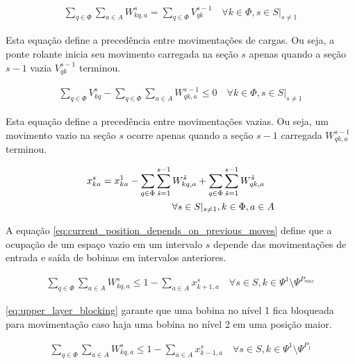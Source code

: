 \documentclass[journal]{IEEEtran}
\begin{document}
        \begin{align}
            \sum_{q \in \Phi} \sum_{a \in A} W^s_{kq,a} = \sum_{q \in \Phi} V^{s-1}_{qk} \quad \forall k \in \Phi, s \in S |_{s \neq 1}
            \label{eq:movement_precence_ld_after_empty}
        \end{align}

        Esta equação define a precedência entre movimentações de cargas. Ou seja,
        a ponte rolante inicia seu movimento carregada na seção $s$ apenas quando
        a seção $s-1$ vazia $V^{s-1}_{qk}$ terminou.

        \begin{align}
            \sum_{q \in \Phi} V^s_{kq} - \sum_{q \in \Phi} \sum_{a \in A} W^{s-1}_{qk,a} \leq 0 \quad \forall k \in \Phi, s \in S |_{s \neq 1}
            \label{eq:movement_precence_empty_after_ld}
        \end{align}

        Esta equação define a precedência entre movimentações vazias. Ou seja,
        um movimento vazio na seção $s$ ocorre apenas quando
        a seção $s-1$ carregada $W^{s-1}_{qk,a}$ terminou.

        \begin{align}
            x^s_{ka} = x^1_{ka} - \sum_{q \in \Phi} \sum_{\hat{s}=1}^{s-1} W^{\hat{s}}_{kq,a} + \sum_{q \in \Phi} \sum_{\hat{s}=1}^{s-1} W^{\hat{s}}_{qk,a} \quad \notag \\
            \forall s \in S |_{s \neq 1}, k \in \Phi, a \in A
            \label{eq:current_position_depends_on_previous_moves}
        \end{align}

        A equação \ref{eq:current_position_depends_on_previous_moves} define
        que a ocupação de um espaço vazio em um intervalo $s$ depende das movimentações
        de entrada e saída de bobinas em intervalos anteriores.


        \begin{align}
            \sum_{q \in \Phi} \sum_{a \in A} W^s_{kq,a} \leq 1 - \sum_{a \in A} x^s_{k+1,a} \quad \forall s \in S, k \in \Psi^1 \setminus \Psi^{P_{max}}
            \label{eq:upper_layer_blocking}
        \end{align}

        \ref{eq:upper_layer_blocking} garante que uma bobina no nível 1 fica 
        bloqueada para movimentação caso haja uma bobina no nível 2 em uma posição
        maior.

        \begin{align}
            \sum_{q \in \Phi} \sum_{a \in A} W^s_{kq,a} \leq 1 - \sum_{a \in A} x^s_{k-1,a} \quad 
            \forall s \in S, k \in \Psi^1 \setminus \Psi^{P_{1}}
            \label{eq:upper_layer_blocking_1}
        \end{align}
\end{document}

